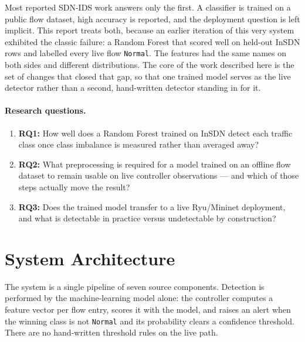 \documentclass[11pt]{article}
\begin{document}
Most reported SDN-IDS work answers only the first. A classifier is trained on a public
flow dataset, high accuracy is reported, and the deployment question is left implicit.
This report treats both, because an earlier iteration of this very system exhibited the
classic failure: a Random Forest that scored well on held-out InSDN rows and labelled
every live flow \texttt{Normal}. The features had the same names on both sides and
different distributions. The core of the work described here is the set of changes that
closed that gap, so that one trained model serves as the live detector rather than a
second, hand-written detector standing in for it.

\paragraph{Research questions.}
\begin{enumerate}
    \item \textbf{RQ1:} How well does a Random Forest trained on InSDN detect each
    traffic class once class imbalance is measured rather than averaged away?
    \item \textbf{RQ2:} What preprocessing is required for a model trained on an offline
    flow dataset to remain usable on live controller observations --- and which of those
    steps actually move the result?
    \item \textbf{RQ3:} Does the trained model transfer to a live Ryu/Mininet deployment,
    and what is detectable in practice versus undetectable by construction?
\end{enumerate}

\section{System Architecture}
The system is a single pipeline of seven source components. Detection is performed by the
machine-learning model alone: the controller computes a feature vector per flow entry,
scores it with the model, and raises an alert when the winning class is not
\texttt{Normal} and its probability clears a confidence threshold. There are no
hand-written threshold rules on the live path.
\end{document}
